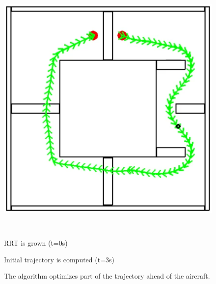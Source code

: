 \begin{figure}[!htb]
\begin{minipage}[b]{.3\linewidth}
        \centering
        \includegraphics[width=0.8\linewidth]{Figures/07_simulation/basic/03basic.png}
    \end{minipage}\\[-7pt]
    \begin{minipage}[t]{.3\linewidth}
    \caption{RRT is grown (t=0s)}
    \label{fig:basic00}
    \end{minipage}%
    \hfill%
    \begin{minipage}[t]{.3\linewidth}
    \caption{Initial trajectory is computed (t=3s)}
    \label{fig:basic01}
    \end{minipage}%
    \hfill%
    \begin{minipage}[t]{.3\linewidth}
    \caption{The algorithm optimizes part of the trajectory ahead of the aircraft.}
    \label{fig:basic03}
    \end{minipage}%
\end{figure}

